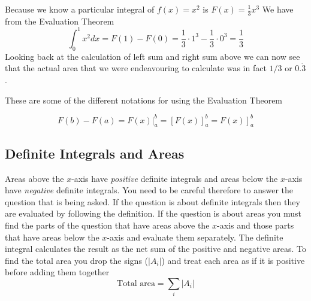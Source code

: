 \solution Because we know a particular integral of $f (x) =x^{2}$ is $F (x) =\frac{1}{3} x^{3}$ We have from the Evaluation Theorem
\begin{equation*}\int _{0}^{1}x^{2} d x =F (1) -F (0) =\frac{1}{3} \cdot 1^{3} -\frac{1}{3} \cdot 0^{3} =\frac{1}{3}
\end{equation*}
Looking back at the calculation of left sum and right sum above we can now see that the actual area
that we were endeavouring to calculate was in fact $1/3$ or $0. \dot{3}$. 

These are some of the different notations for using the Evaluation Theorem 

\begin{equation*}F (b) -F (a) =F (x)\vert _{a}^{b} =\left [F (x)\right ]_{a}^{b} =\left .F (x)\right ]_{a}^{b}
\end{equation*}

\subsection*{Definite Integrals and Areas}
Areas above the $x$-axis have \emph{positive} definite integrals and areas below the $x$-axis have \emph{negative} definite integrals. You need to be careful
therefore to answer the question that is being asked. If the question is about definite integrals then they
are evaluated by following the definition. If the question is about areas you must find the parts of the question
that have areas above the $x$-axis and those parts that have areas below the $x$-axis and evaluate them separately. The definite integral calculates the result as
the net sum of the positive and negative areas. To find the total area you drop the signs ($\left \vert A_{i}\right \vert $) and treat each area as if it is positive before adding them together
\begin{equation*}\text{Total area} =\sum _{i}\left \vert A_{i}\right \vert 
\end{equation*}

